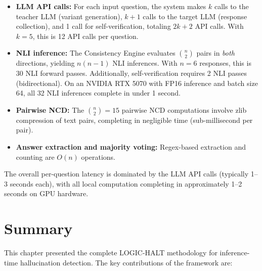 \begin{itemize}
    \item \textbf{LLM API calls:} For each input question, the system makes $k$ calls to the teacher LLM (variant generation), $k + 1$ calls to the target LLM (response collection), and 1 call for self-verification, totaling $2k + 2$ API calls. With $k = 5$, this is 12 API calls per question.

    \item \textbf{NLI inference:} The Consistency Engine evaluates $\binom{n}{2}$ pairs in \emph{both} directions, yielding $n(n-1)$ NLI inferences. With $n = 6$ responses, this is 30 NLI forward passes. Additionally, self-verification requires 2 NLI passes (bidirectional). On an NVIDIA RTX 5070 with FP16 inference and batch size 64, all 32 NLI inferences complete in under 1 second.

    \item \textbf{Pairwise NCD:} The $\binom{n}{2} = 15$ pairwise NCD computations involve zlib compression of text pairs, completing in negligible time (sub-millisecond per pair).

    \item \textbf{Answer extraction and majority voting:} Regex-based extraction and counting are $O(n)$ operations.
\end{itemize}

\noindent
The overall per-question latency is dominated by the LLM API calls (typically 1--3 seconds each), with all local computation completing in approximately 1--2 seconds on GPU hardware.


\section{Summary}

This chapter presented the complete LOGIC-HALT methodology for inference-time hallucination detection. The key contributions of the framework are:

